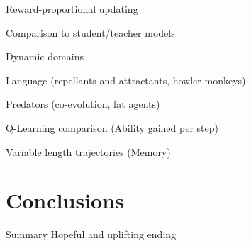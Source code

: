 \documentclass{acm_proc_article-sp}
\begin{document}
Reward-proportional updating

Comparison to student/teacher models

Dynamic domains

Language (repellants and attractants, howler monkeys)

Predators (co-evolution, fat agents)

Q-Learning comparison (Ability gained per step)

Variable length trajectories (Memory)

\section{Conclusions}
\label{sec:conclusions}
Summary
Hopeful and uplifting ending

%

%
%
\end{document}
